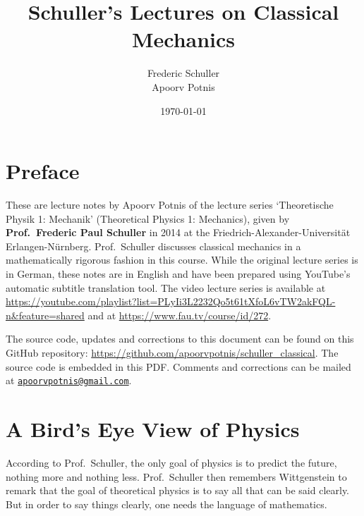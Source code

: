 \documentclass[a4 paper, oneside, 12pt]{book}
\title{Schuller's Lectures on Classical Mechanics}
\author{Frederic Schuller\\Apoorv Potnis}
\date{\today}
\theoremstyle{definition}
\begin{document}
	\hypertarget{TitlePage}{}
	\maketitle

	\chapter*{Preface}
	\hypertarget{Preface}{}
	These are lecture notes by Apoorv Potnis of the lecture series `Theoretische Physik 1: Mechanik' (Theoretical Physics 1: Mechanics), given by \textbf{Prof.\ Frederic Paul Schuller} in 2014 at the Friedrich-Alexander-Universität Erlangen-Nürnberg. Prof.\ Schuller discusses classical mechanics in a mathematically rigorous fashion in this course. While the original lecture series is in German, these notes are in English and have been prepared using YouTube's automatic subtitle translation tool. The video lecture series is available at \url{https://youtube.com/playlist?list=PLyIi3L2232Qo5t61tXfoL6vTW2akFQL-n&feature=shared} and at \url{https://www.fau.tv/course/id/272}.

	The source code, updates and corrections to this document can be found on this GitHub repository: \url{https://github.com/apoorvpotnis/schuller_classical}. The source code is embedded in this PDF. Comments and corrections can be mailed at \href{mailto:apoorvpotnis@gmail.com}{\texttt{apoorvpotnis@gmail.com}}.
	\clearpage

	\hypertarget{Contents}{}
	\tableofcontents

	\chapter{A Bird's Eye View of Physics}

	According to Prof.\ Schuller, the only goal of physics is to predict the future, nothing more and nothing less. Prof.\ Schuller then remembers Wittgenstein to remark that the goal of theoretical physics is to say all that can be said clearly. But in order to say things clearly, one needs the language of mathematics.
\end{document}
